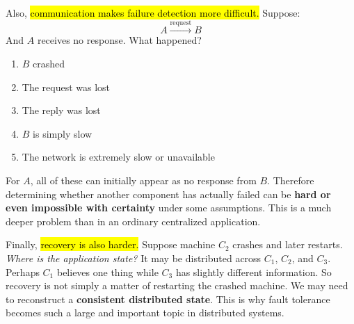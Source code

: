 \highspace
Also, \hl{communication makes failure detection more difficult.} Suppose:
\begin{equation*}
    A \xrightarrow{\text{request}} B
\end{equation*}
And $A$ receives no response. What happened?
\begin{enumerate}
    \item $B$ crashed
    \item The request was lost
    \item The reply was lost
    \item $B$ is simply slow
    \item The network is extremely slow or unavailable
\end{enumerate}
For $A$, all of these can initially appear as no response from $B$. Therefore determining whether another component has actually failed can be \textbf{hard or even impossible with certainty} under some assumptions. This is a much deeper problem than in an ordinary centralized application.

\highspace
Finally, \hl{recovery is also harder.} Suppose machine $C_2$ crashes and later restarts. \emph{Where is the application state?} It may be distributed across $C_1$, $C_2$, and $C_3$. Perhaps $C_1$ believes one thing while $C_3$ has slightly different information. So recovery is not simply a matter of restarting the crashed machine. We may need to reconstruct a \textbf{consistent distributed state}. This is why fault tolerance becomes such a large and important topic in distributed systems.

